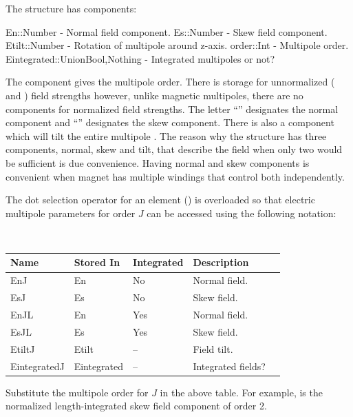The  structure has components:
\begin{example}
  En::Number     - Normal field component.
  Es::Number     - Skew field component.
  Etilt::Number  - Rotation of multipole around z-axis.
  order::Int     - Multipole order.
  Eintegrated::Union{Bool,Nothing} - Integrated multipoles or not? 
\end{example}
The  component gives the multipole order.
There is storage for unnormalized ( and ) field strengths however, unlike magnetic
multipoles, there are no components for normalized field strengths. 
The letter ``'' designates the normal component and ``'' designates the skew component. 
There is also a  component which will tilt the entire multipole \cite{???}.
The reason why the structure has three components, 
normal, skew and tilt, that describe the field when only two would be sufficient is due convenience.
Having normal and skew components is convenient when magnet has multiple windings that control
both independently.

The dot selection operator for an element () is overloaded so that 
electric multipole parameters for order $J$ can be accessed using the following notation:
\hfill\break
{\tt
\begin{tabular}{lllll} \toprule
  Name         & Stored In   & Integrated & Description \\ \midrule
  EnJ          & En          & No         & Normal field. \\
  EsJ          & Es          & No         & Skew field. \\
  EnJL         & En          & Yes        & Normal field. \\
  EsJL         & Es          & Yes        & Skew field. \\
  EtiltJ       & Etilt       & --         & Field tilt. \\
  EintegratedJ & Eintegrated & --         & Integrated fields? \\
  \bottomrule
\end{tabular}
} 
\hfill\break
Substitute the multipole order for $J$ in the above table. For example,  is the
normalized length-integrated skew field component of order 2. 

